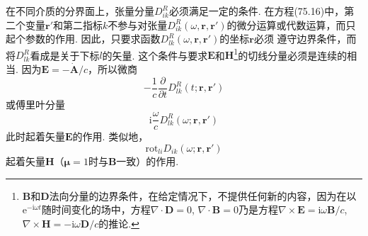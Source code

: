 在不同介质的分界面上，张量分量$D_{ik}^{R}$必须满足一定的条件. 在方程(75.16)中，第二个变量$\bm{r}'$和第二指标$k$不参与对张量$D_{ik}^{R}(\omega,\bm{r},\bm{r}')$的微分运算或代数运算，而只起个参数的作用. 因此，只要求函数$D_{lk}^{R}(\omega,\bm{r},\bm{r}')$的坐标$\bm{r}$必须
遵守边界条件，而将$D_{lk}^{R}$看成是关于下标$l$的矢量. 这个条件与要求$\bm{E}$和$\bm{H}$\footnote{$\bm{B}$和$\bm{D}$法向分量的边界条件，在给定情况下，不提供任何新的内容，因为在以$\mathrm{e}^{-\mathrm{i}\omega t}$随时间变化的场中，方程$\nabla\cdot\bm{D}=0$, $\nabla\cdot\bm{B}=0$乃是方程$\nabla\times\bm{E}=\mathrm{i}\omega\bm{B}/c$, $\nabla\times\bm{H}=-\mathrm{i}\omega\bm{D}/c$的推论.}的切线分量必须是连续的相当. 因为$\bm{E}=-\dot{\bm{A}}/c$，所以微商
\begin{equation*}
-\frac{1}{c}\frac{\partial}{\partial t}D_{lk}^{R}(t;\bm{r},\bm{r}')
\end{equation*}
或傅里叶分量
\begin{equation}
\mathrm{i}\frac{\omega}{c}D_{lk}^{R}(\omega;\bm{r},\bm{r}')
\end{equation}
此时起着矢量$\bm{E}$的作用. 类似地，
\begin{equation}
\mathrm{rot}_{li}D_{ik}(\omega;\bm{r},\bm{r}')
\end{equation}
起着矢量$\bm{H}$（$\bm{\mu}=1$时与$\bm{B}$一致）的作用.

